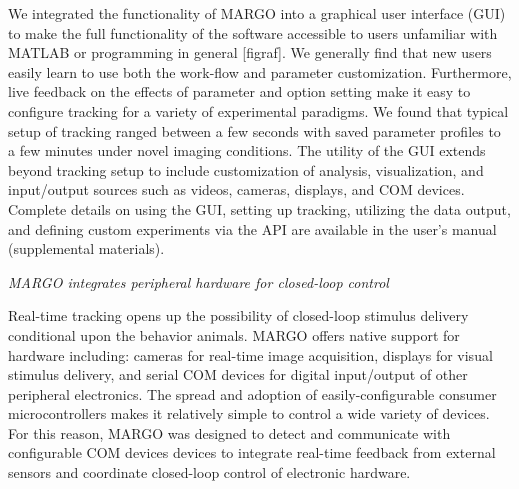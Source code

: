\documentclass[10pt]{article}
\begin{document}
\begin{multicols}{2}
We integrated the functionality of MARGO into a graphical user interface (GUI) to make the full functionality of the software accessible to users unfamiliar with MATLAB or programming in general [figraf]. We generally find that new users easily learn to use both the work-flow and parameter customization. Furthermore, live feedback on the effects of parameter and option setting make it easy to configure tracking for a variety of experimental paradigms. We found that typical setup of tracking ranged between a few seconds with saved parameter profiles to a few minutes under novel imaging conditions. The utility of the GUI extends beyond tracking setup to include customization of analysis, visualization, and input/output sources such as videos, cameras, displays, and COM devices. Complete details on using the GUI, setting up tracking, utilizing the data output, and defining custom experiments via the API are available in the user's manual (supplemental materials).


\textit{MARGO integrates peripheral hardware for closed-loop control}

Real-time tracking opens up the possibility of closed-loop stimulus delivery conditional upon the behavior animals. MARGO offers native support for hardware including: cameras for real-time image acquisition, displays for visual stimulus delivery, and serial COM devices for digital input/output of other peripheral electronics. The spread and adoption of easily-configurable consumer microcontrollers makes it relatively simple to control a wide variety of devices. For this reason, MARGO was designed to detect and communicate with configurable COM devices devices to integrate real-time feedback from external sensors and coordinate closed-loop control of electronic hardware. 


\end{multicols}
\end{document}
